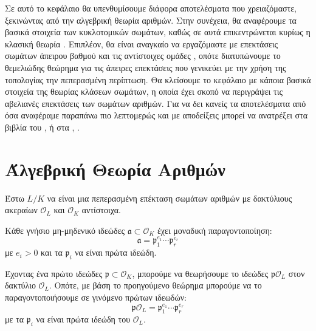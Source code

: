 
\noindent Σε αυτό το κεφάλαιο θα υπενθυμίσουμε διάφορα αποτελέσματα που χρειαζόμαστε, ξεκινώντας από την αλγεβρική θεωρία αριθμών. Στην συνέχεια, θα αναφέρουμε τα 
βασικά στοιχεία των κυκλοτομικών σωμάτων, καθώς σε αυτά επικεντρώνεται κυρίως η κλασική θεωρία . Επιπλέον, θα είναι αναγκαίο να εργαζόμαστε 
με επεκτάσεις σωμάτων άπειρου βαθμού και τις αντίστοιχες ομάδες , οπότε διατυπώνουμε το θεμελιώδης θεώρημα για τις άπειρες επεκτάσεις που 
γενικεύει με την χρήση της τοπολογίας την πεπερασμένη περίπτωση. Θα κλείσουμε το κεφάλαιο με κάποια βασικά στοιχεία της θεωρίας κλάσεων σωμάτων, η οποία έχει σκοπό να περιγράψει τις αβελιανές επεκτάσεις των σωμάτων αριθμών. 
Για να δει κανείς τα αποτελέσματα από όσα αναφέραμε παραπάνω πιο λεπτομερώς και με αποδείξεις μπορεί να ανατρέξει στα βιβλία του  \cite{Milne1}, \cite{Milne2} ή στα \cite{kontogar}, \cite{CF}.


\section{Άλγεβρική Θεωρία Αριθμών}

\noindent Έστω $L/K$ να είναι μια πεπερασμένη επέκταση σωμάτων αριθμών με δακτύλιους ακεραίων $\mathcal{O}_L$ και $\mathcal{O}_K$ αντίστοιχα.

\begin{theorem}
	Κάθε γνήσιο μη-μηδενικό ιδεώδες $\mathfrak{a} \subset \mathcal{O}_K$ έχει μοναδική παραγοντοποίηση:
	$$\mathfrak{a} = \mathfrak{p}_1^{e_1} \cdots \mathfrak{p}_r^{e_r}$$ με $e_i > 0$ και τα $\mathfrak{p}_i$ να είναι πρώτα ιδεώδη.
\end{theorem}

\noindent Έχοντας ένα πρώτο ιδεώδες $\mathfrak{p} \subset \mathcal{O}_K$, μπορούμε να θεωρήσουμε το ιδεώδες $\mathfrak{p} \mathcal{O}_L$ στον 
δακτύλιο $\mathcal{O}_L$. Οπότε, με βάση το προηγούμενο θεώρημα μπορούμε να το παραγοντοποιήσουμε σε γινόμενο πρώτων ιδεωδών:
\begin{equation}
	\label{eq2.1}
	\mathfrak{p}\mathcal{O}_L = \mathfrak{p}_1^{e_1} \cdots \mathfrak{p}_r^{e_r}
\end{equation}  με τα $\mathfrak{p}_i$ να είναι πρώτα ιδεώδη του $\mathcal{O}_L$.


